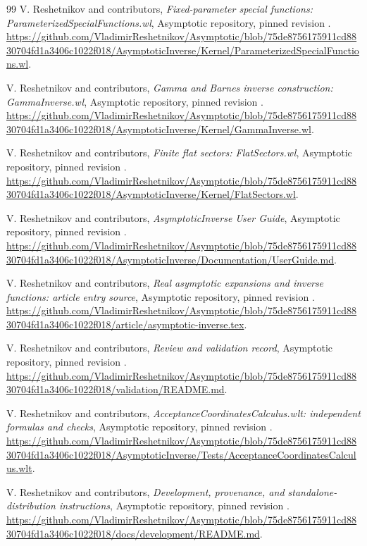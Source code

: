 \begin{thebibliography}{99}
 V. Reshetnikov and contributors, \emph{Fixed-parameter special functions: ParameterizedSpecialFunctions.wl}, Asymptotic repository, pinned revision \commit. \url{https://github.com/VladimirReshetnikov/Asymptotic/blob/75de8756175911cd8830704fd1a3406c1022f018/AsymptoticInverse/Kernel/ParameterizedSpecialFunctions.wl}.

 V. Reshetnikov and contributors, \emph{Gamma and Barnes inverse construction: GammaInverse.wl}, Asymptotic repository, pinned revision \commit. \url{https://github.com/VladimirReshetnikov/Asymptotic/blob/75de8756175911cd8830704fd1a3406c1022f018/AsymptoticInverse/Kernel/GammaInverse.wl}.

 V. Reshetnikov and contributors, \emph{Finite flat sectors: FlatSectors.wl}, Asymptotic repository, pinned revision \commit. \url{https://github.com/VladimirReshetnikov/Asymptotic/blob/75de8756175911cd8830704fd1a3406c1022f018/AsymptoticInverse/Kernel/FlatSectors.wl}.

 V. Reshetnikov and contributors, \emph{AsymptoticInverse User Guide}, Asymptotic repository, pinned revision \commit. \url{https://github.com/VladimirReshetnikov/Asymptotic/blob/75de8756175911cd8830704fd1a3406c1022f018/AsymptoticInverse/Documentation/UserGuide.md}.

 V. Reshetnikov and contributors, \emph{Real asymptotic expansions and inverse functions: article entry source}, Asymptotic repository, pinned revision \commit. \url{https://github.com/VladimirReshetnikov/Asymptotic/blob/75de8756175911cd8830704fd1a3406c1022f018/article/asymptotic-inverse.tex}.

 V. Reshetnikov and contributors, \emph{Review and validation record}, Asymptotic repository, pinned revision \commit. \url{https://github.com/VladimirReshetnikov/Asymptotic/blob/75de8756175911cd8830704fd1a3406c1022f018/validation/README.md}.

 V. Reshetnikov and contributors, \emph{AcceptanceCoordinatesCalculus.wlt: independent formulas and checks}, Asymptotic repository, pinned revision \commit. \url{https://github.com/VladimirReshetnikov/Asymptotic/blob/75de8756175911cd8830704fd1a3406c1022f018/AsymptoticInverse/Tests/AcceptanceCoordinatesCalculus.wlt}.

 V. Reshetnikov and contributors, \emph{Development, provenance, and standalone-distribution instructions}, Asymptotic repository, pinned revision \commit. \url{https://github.com/VladimirReshetnikov/Asymptotic/blob/75de8756175911cd8830704fd1a3406c1022f018/docs/development/README.md}.


\end{thebibliography}
